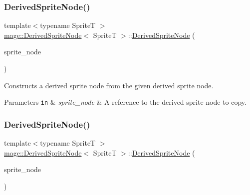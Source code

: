 \subsubsection{\texorpdfstring{Derived\+Sprite\+Node()}{DerivedSpriteNode()}\hspace{0.1cm}{\footnotesize\ttfamily [2/3]}}
{\footnotesize\ttfamily template$<$typename SpriteT $>$ \\
\hyperlink{classmage_1_1_derived_sprite_node}{mage\+::\+Derived\+Sprite\+Node}$<$ SpriteT $>$\+::\hyperlink{classmage_1_1_derived_sprite_node}{Derived\+Sprite\+Node} (\begin{DoxyParamCaption}\item[{const \hyperlink{classmage_1_1_derived_sprite_node}{Derived\+Sprite\+Node}$<$ SpriteT $>$ \&}]{sprite\+\_\+node }\end{DoxyParamCaption})}

Constructs a derived sprite node from the given derived sprite node.


\begin{DoxyParams}[1]{Parameters}
\mbox{\tt in}  & {\em sprite\+\_\+node} & A reference to the derived sprite node to copy. \\
\hline
\end{DoxyParams}
\hypertarget{classmage_1_1_derived_sprite_node_a9ef3c0d79ef13edde2fab7e1f3c5d451}{}\label{classmage_1_1_derived_sprite_node_a9ef3c0d79ef13edde2fab7e1f3c5d451} 
\subsubsection{\texorpdfstring{Derived\+Sprite\+Node()}{DerivedSpriteNode()}\hspace{0.1cm}{\footnotesize\ttfamily [3/3]}}
{\footnotesize\ttfamily template$<$typename SpriteT $>$ \\
\hyperlink{classmage_1_1_derived_sprite_node}{mage\+::\+Derived\+Sprite\+Node}$<$ SpriteT $>$\+::\hyperlink{classmage_1_1_derived_sprite_node}{Derived\+Sprite\+Node} (\begin{DoxyParamCaption}\item[{\hyperlink{classmage_1_1_derived_sprite_node}{Derived\+Sprite\+Node}$<$ SpriteT $>$ \&\&}]{sprite\+\_\+node }\end{DoxyParamCaption})\hspace{0.3cm}{\ttfamily [noexcept]}}

